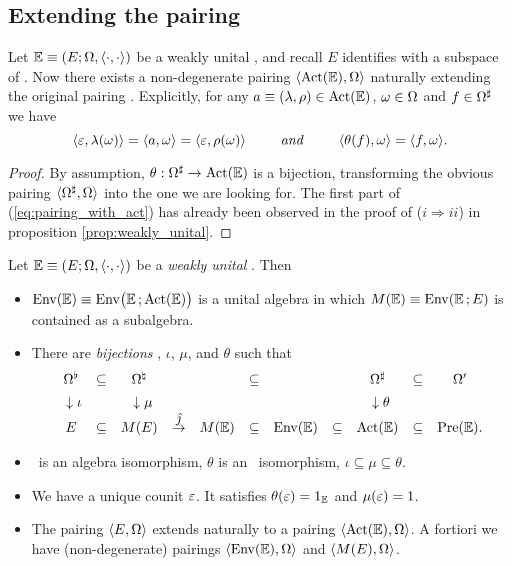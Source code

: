 \subsection{Extending the pairing}

\begin{prop}
  \label{prop:extended_pairing}
  Let\/ $\EE \equiv \EOP$ be a weakly unital \context, and recall\/ $E$
  identifies with a subspace of\/ \ActE\@.
  Now there exists a non-degenerate pairing $\pair{\ActE}{\Om}$
  naturally extending the original pairing \@.
  Explicitly, for any $a\equiv(\lam,\rho)\in \ActE$, $\om\in\Om$ and $f\in\Om\adl$ we have
  \begin{equation} \label{eq:pairing_with_act}
     \pair{\eps}{\lam(\om)} = \pair{a}{\om} = \pair{\eps}{\rho(\om)}
           \itandspace{2.5em}
     \pair{\theta(f)}{\om} = \pair{f}{\om}.
  \end{equation}
\end{prop}
\begin{proof}
  By assumption, $\theta: \Om\adl \rarr \ActE$ is a bijection,
  transforming the obvious pairing $\pair{\Om\adl}{\Om}$ into
  the one we are looking for.
  The first part of (\ref{eq:pairing_with_act}) has already been observed
  in the proof of ($i \Rightarrow ii$) in proposition \ref{prop:weakly_unital}\@.
\end{proof}


\begin{summary} \label{summ:weakly_unital_ids} \rm
  Let $\EE \equiv \EOP$ be a {\em weakly unital\/} \context\@. Then
  \begin{itemize}
   \item $\EnvE\equiv {\rm Env} \!\left(\vertM\EE\,;\ActE\right)$ is a unital algebra
      in which $M(\EE)\equiv {\rm Env}(\EE\,;E)$ is contained as a subalgebra.
   \item There are {\em bijections\/}
         \jhat, $\iota$, $\mu$, and $\theta$ such that
   $$\begin{array}{ccccccccccccc}
      \Om\wdl &\subseteq& \Om\mdl
            & & &\subseteq&  &  &
                                 \Om\adl &\subseteq& \Om'     \\
      \makebox[1.5pt]{} \downarrow\iota & \rule{0pt}{3ex} &
      \makebox[2.5pt]{} \downarrow\mu & &  & &
      \makebox[2pt]{}   & &
      \makebox[2pt]{} \downarrow\theta & &  \\
      E &\subseteq& M(E) &\stackrel{\jhat}{\rightarrow}&
            M(\EE) &\subseteq& \EnvE &\subseteq& \ActE &\subseteq& \PreE.
     \end{array}  $$
   \item \jhat\ is an algebra isomorphism, $\theta$ is an \Ebimod\ isomorphism, $\iota \subseteq \mu \subseteq \theta$.
   \item We have a unique counit $\eps$. It satisfies
        $\theta(\eps)=1_{\EE}$ and $\mu(\eps)=1$.
   \item The pairing $\pair{E}{\Om}$ extends naturally to a pairing
     $\pair{\ActE}{\Om}$. A fortiori we have (non-degenerate)
     pairings $\pair{\EnvE}{\Om}$ and $\pair{M(E)}{\Om}$.
  \end{itemize}
\end{summary}




